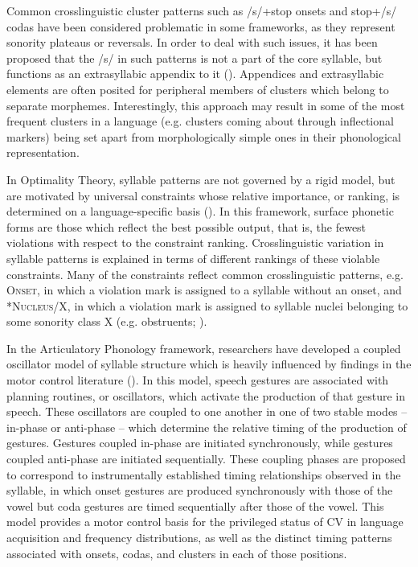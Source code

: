   Common crosslinguistic cluster patterns such as /s/+stop onsets and stop+/s/ codas have been considered problematic in some frameworks, as they represent sonority plateaus or reversals. In order to deal with such issues, it has been proposed that the /s/ in such patterns is not a part of the core syllable, but functions as an extrasyllabic appendix to it (\citealt{VauxWolfe2009,Duanmu2011}). Appendices and extrasyllabic elements are often posited for peripheral members of clusters which belong to separate morphemes. Interestingly, this approach may result in some of the most frequent clusters in a language (e.g. clusters coming about through inflectional markers) being set apart from morphologically simple ones in their phonological representation.

  In Optimality Theory, syllable patterns are not governed by a rigid model, but are motivated by universal constraints whose relative importance, or ranking, is determined on a language-specific basis (\citealt{PrinceSmolensky1993}). In this framework, surface phonetic forms are those which reflect the best possible output, that is, the fewest violations with respect to the constraint ranking. Crosslinguistic variation in syllable patterns is explained in terms of different rankings of these violable constraints. Many of the constraints reflect common crosslinguistic patterns, e.g. \textsc{Onset}, in which a violation mark is assigned to a syllable without an onset, and *\textsc{Nucleus}/X, in which a violation mark is assigned to syllable nuclei belonging to some sonority class X (e.g. obstruents; \citealt{McCarthy2008}).

  In the Articulatory Phonology framework, researchers have developed a coupled oscillator model of syllable structure which is heavily influenced by findings in the motor control literature (\citealt{NamSaltzman2003,GoldsteinEtAl2006,NamEtAl2009}). In this model, speech gestures are associated with planning routines, or oscillators, which activate the production of that gesture in speech. These oscillators are coupled to one another in one of two stable modes -- in-phase or anti-phase -- which determine the relative timing of the production of gestures. Gestures coupled in-phase are initiated synchronously, while gestures coupled anti-phase are initiated sequentially. These coupling phases are proposed to correspond to instrumentally established timing relationships observed in the syllable, in which onset gestures are produced synchronously with those of the vowel but coda gestures are timed sequentially after those of the vowel. This model provides a motor control basis for the privileged status of CV in language acquisition and frequency distributions, as well as the distinct timing patterns associated with onsets, codas, and clusters in each of those positions.

